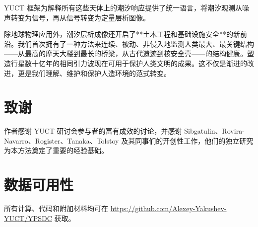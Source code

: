 \documentclass[12pt,a4paper]{article}
\theoremstyle{remark}
\begin{document}
	YUCT 框架为解释所有这些天体上的潮汐响应提供了统一语言，将潮汐观测从噪声转变为信号，再从信号转变为定量层析图像。
	
	除地球物理应用外，潮汐层析成像还开启了**土木工程和基础设施安全**的新前沿。我们首次拥有了一种方法来连续、被动、非侵入地监测人类最大、最关键结构——从最高的摩天大楼到最长的桥梁，从古代遗迹到核安全壳——的结构健康。塑造行星数十亿年的相同引力波现在可用于保护人类文明的成果。这不仅是渐进的改进，更是我们理解、维护和保护人造环境的范式转变。
	
	\section*{致谢}
	
	作者感谢 YUCT 研讨会参与者的富有成效的讨论，并感谢 Sibgatulin、Rovira-Navarro、Rogister、Tanaka、Tolstoy 及其同事们的开创性工作，他们的独立研究为本方法奠定了重要的经验基础。
	
	\section*{数据可用性}
	
	所有计算、代码和附加材料均可在 \url{https://github.com/Alexey-Yakushev-YUCT/YPSDC} 获取。
	
\end{document}
